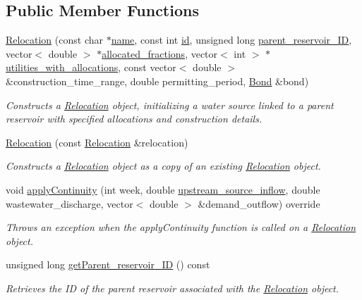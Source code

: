 \subsection*{Public Member Functions}
\begin{DoxyCompactItemize}
\item 
\mbox{\hyperlink{classRelocation_abeada1f0c797d8992c1e6a200b571574}{Relocation}} (const char $\ast$\mbox{\hyperlink{classWaterSource_a846ea74c5b453d014f594d41fee8c765}{name}}, const int \mbox{\hyperlink{classWaterSource_a6eafe5dfefd317877d1244e8a7c6e742}{id}}, unsigned long \mbox{\hyperlink{classRelocation_a61282254064f00641aaec667a7eb0652}{parent\+\_\+reservoir\+\_\+\+ID}}, vector$<$ double $>$ $\ast$\mbox{\hyperlink{classWaterSource_a2f6655a80c4847fe039987255d9d998c}{allocated\+\_\+fractions}}, vector$<$ int $>$ $\ast$\mbox{\hyperlink{classRelocation_ae426f390487b6b67f19bfbf556c922c2}{utilities\+\_\+with\+\_\+allocations}}, const vector$<$ double $>$ \&construction\+\_\+time\+\_\+range, double permitting\+\_\+period, \mbox{\hyperlink{classBond}{Bond}} \&bond)
\begin{DoxyCompactList}\small\item\em Constructs a \mbox{\hyperlink{classRelocation}{Relocation}} object, initializing a water source linked to a parent reservoir with specified allocations and construction details. \end{DoxyCompactList}\item 
\mbox{\hyperlink{classRelocation_a51eeb6a7d2b07940c2688b9b550145f0}{Relocation}} (const \mbox{\hyperlink{classRelocation}{Relocation}} \&relocation)
\begin{DoxyCompactList}\small\item\em Constructs a \mbox{\hyperlink{classRelocation}{Relocation}} object as a copy of an existing \mbox{\hyperlink{classRelocation}{Relocation}} object. \end{DoxyCompactList}\item 
void \mbox{\hyperlink{classRelocation_af5c795c7b331b86b31c8bfa2ef9b6fe5}{apply\+Continuity}} (int week, double \mbox{\hyperlink{classWaterSource_a7a69b2e9b6030f1035e6cf44d2918ee5}{upstream\+\_\+source\+\_\+inflow}}, double wastewater\+\_\+discharge, vector$<$ double $>$ \&demand\+\_\+outflow) override
\begin{DoxyCompactList}\small\item\em Throws an exception when the apply\+Continuity function is called on a \mbox{\hyperlink{classRelocation}{Relocation}} object. \end{DoxyCompactList}\item 
unsigned long \mbox{\hyperlink{classRelocation_ae04b94d64c0ffd9a14dcdafdea551988}{get\+Parent\+\_\+reservoir\+\_\+\+ID}} () const
\begin{DoxyCompactList}\small\item\em Retrieves the ID of the parent reservoir associated with the \mbox{\hyperlink{classRelocation}{Relocation}} object. \end{DoxyCompactList}\end{DoxyCompactItemize}

